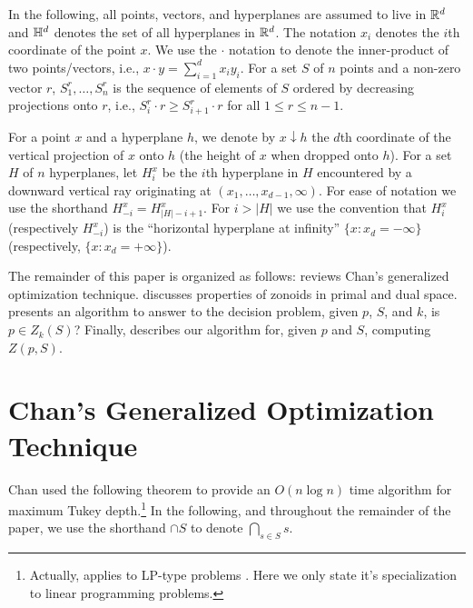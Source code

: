\documentclass[lotsofwhite]{patmorin}
\newcommand{\drop}{\!\!\downarrow\!\!}
\begin{document}
In the following, all points, vectors, and hyperplanes are assumed to
live in $\mathbb{R}^d$ and $\mathbb{H}^d$ denotes the set of all hyperplanes in
$\mathbb{R}^d$.  The notation $x_i$ denotes the $i$th coordinate of the point
$x$.  We use the $\cdot$ notation to denote the inner-product of two
points/vectors, i.e., $x\cdot y=\sum_{i=1}^d x_iy_i$.  For a set $S$
of $n$ points and a non-zero vector $r$, $S_1^r,\ldots,S_n^r$ is the
sequence of elements of $S$ ordered by decreasing projections onto
$r$, i.e., $S_i^r\cdot r \ge S_{i+1}^r\cdot r$ for all $1\le r\le
n-1$.

For a point $x$ and a hyperplane $h$, we denote by $x\drop h$ the
$d$th coordinate of the vertical projection of $x$ onto $h$ (the
height of $x$ when dropped onto $h$).  For a set $H$ of $n$
hyperplanes, let $H_i^x$ be the $i$th hyperplane in $H$ encountered by
a downward vertical ray originating at $(x_1,\ldots,x_{d-1},\infty)$.
For ease of notation we use the shorthand $H_{-i}^x=H_{|H|-i+1}^x$.
For $i>|H|$ we use the convention that $H_{i}^x$ (respectively
$H_{-i}^x$) is the ``horizontal hyperplane at infinity''
$\{x:x_d=-\infty\}$ (respectively, $\{x:x_d=+\infty\}$). 

The remainder of this paper is organized as follows: 
reviews Chan's generalized optimization technique.  
discusses properties of zonoids in primal and dual space.
 presents an algorithm to answer to the decision
problem, given $p$, $S$, and $k$, is $p\in Z_k(S)$?  Finally,
 describes our algorithm for, given $p$ and $S$,
computing $Z(p,S)$.
 
\section{Chan's Generalized Optimization Technique}

Chan \cite{c04} used the following theorem to provide an $O(n\log n)$
time algorithm for maximum Tukey depth.\footnote{Actually,
 applies to LP-type problems \cite{sw92}. Here we only
state it's specialization to linear programming problems.}  In the
following, and throughout the remainder of the paper, we use the
shorthand $\cap S$ to denote $\bigcap_{s\in S}s$.
\end{document}
